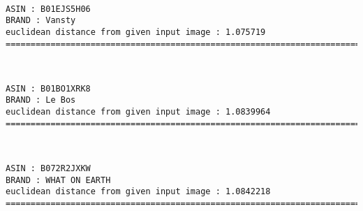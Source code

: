 \documentclass[11pt]{article}
\begin{document}
    \begin{center}
    \end{center}
    { \hspace*{\fill} \\}
    
    \begin{Verbatim}[commandchars=\\\{\}]
ASIN : B01EJS5H06
BRAND : Vansty
euclidean distance from given input image : 1.075719
=============================================================================================================================

    \end{Verbatim}

    \begin{center}
    \end{center}
    { \hspace*{\fill} \\}
    
    \begin{Verbatim}[commandchars=\\\{\}]
ASIN : B01BO1XRK8
BRAND : Le Bos
euclidean distance from given input image : 1.0839964
=============================================================================================================================

    \end{Verbatim}

    \begin{center}
    \end{center}
    { \hspace*{\fill} \\}
    
    \begin{Verbatim}[commandchars=\\\{\}]
ASIN : B072R2JXKW
BRAND : WHAT ON EARTH
euclidean distance from given input image : 1.0842218
=============================================================================================================================

    \end{Verbatim}

    \begin{center}
    \end{center}
    { \hspace*{\fill} \\}
    
\end{document}

